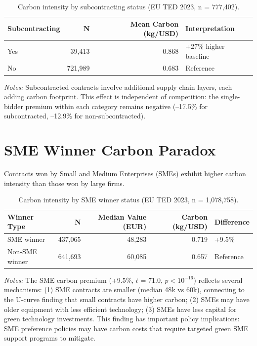 \documentclass[11pt]{article}
\newcommand{\tabnoteblock}[1]{%
    \par\vspace{0.45em}%
    \begin{minipage}{0.98\linewidth}
    \footnotesize\raggedright #1
    \end{minipage}\par
}
\newcommand{\tabnotes}[1]{\tabnoteblock{\textit{Notes:} #1}}
\begin{document}
\begin{table}[H]
\centering
\caption{Carbon intensity by subcontracting status (EU TED 2023, n = 777,402).}
\label{tab:subcontracting}
\begin{tabular}{lrrl}
\toprule
\textbf{Subcontracting} & \textbf{N} & \textbf{Mean Carbon (kg/USD)} & \textbf{Interpretation} \\
\midrule
Yes & 39,413 & 0.868 & +27\% higher baseline \\
No & 721,989 & 0.683 & Reference \\
\bottomrule
\end{tabular}

\tabnotes{Subcontracted contracts involve additional supply chain layers, each adding carbon footprint. This effect is independent of competition: the single-bidder premium within each category remains negative (--17.5\% for subcontracted, --12.9\% for non-subcontracted).
}
\end{table}

\section{SME Winner Carbon Paradox}

Contracts won by Small and Medium Enterprises (SMEs) exhibit higher carbon intensity than those won by large firms.

\begin{table}[H]
\centering
\caption{Carbon intensity by SME winner status (EU TED 2023, n = 1,078,758).}
\label{tab:sme_carbon}
\begin{tabular}{lrrrl}
\toprule
\textbf{Winner Type} & \textbf{N} & \textbf{Median Value (EUR)} & \textbf{Carbon (kg/USD)} & \textbf{Difference} \\
\midrule
SME winner & 437,065 & 48,283 & 0.719 & +9.5\% \\
Non-SME winner & 641,693 & 60,085 & 0.657 & Reference \\
\bottomrule
\end{tabular}

\tabnotes{The SME carbon premium (+9.5\%, $t$ = 71.0, $p < 10^{-16}$) reflects several mechanisms: (1) SME contracts are smaller (median \texteuro48k vs \texteuro60k), connecting to the U-curve finding that small contracts have higher carbon; (2) SMEs may have older equipment with less efficient technology; (3) SMEs have less capital for green technology investments. This finding has important policy implications: SME preference policies may have carbon costs that require targeted green SME support programs to mitigate.
}
\end{table}
\end{document}
